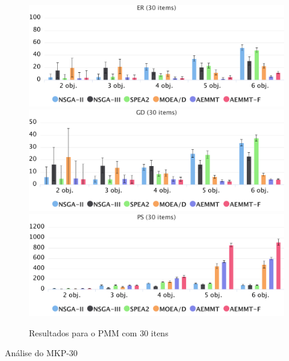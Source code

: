 \begin{figure}[!htbp]
	\caption{Resultados para o PMM com 30 itens}
	\label{fig_exp1_mkp_30}
	\includegraphics[width=1\textwidth]{cap_experimentos/figs/er-mkp-30}
	\includegraphics[width=1\textwidth]{cap_experimentos/figs/gd-mkp-30}
	\includegraphics[width=1\textwidth]{cap_experimentos/figs/ps-mkp-30}
\end{figure}

Análise do MKP-30

